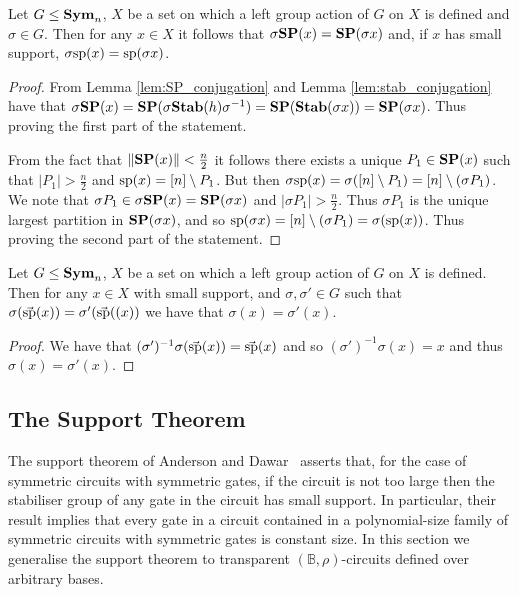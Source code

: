 \documentclass[../paper.tex]{subfiles}
\begin{document}
\begin{lem}
  \label{lem:support-mapping}
  Let $G \leq \text{\textbf{Sym}}_n$, $X$ be a set on which a left group action of $G$ on $X$
  is defined and $\sigma \in G$. Then for any $x \in X$ it follows that $\sigma
  \text{\textbf{SP}} (x) = \text{\textbf{SP}} (\sigma x)$ and, if $x$ has small support, $\sigma \text{sp} (x) =
  \text{sp} (\sigma x)$.
\end{lem}
\begin{proof}
  From Lemma \ref{lem:SP_conjugation} and Lemma \ref{lem:stab_conjugation} have
  that $\sigma \text{\textbf{SP}} (x) = \text{\textbf{SP}}(\sigma \text{\textbf{Stab}}(h) \sigma^{-1}) = \text{\textbf{SP}} (\text{\textbf{Stab}}(\sigma
  x)) = \text{\textbf{SP}} (\sigma x)$. Thus proving the first part of the statement.

  From the fact that $\| \text{\textbf{SP}}(x) \| < \frac{n}{2}$ it follows there exists a
  unique $P_1 \in \text{\textbf{SP}}(x)$ such that $\vert P_1 \vert > \frac{n}{2}$ and
  $\text{sp}(x) = [n] \setminus P_1$. But then $\sigma \text{sp} (x) = \sigma([n]
  \setminus P_1) = [n] \setminus (\sigma P_1)$. We note that $\sigma P_1 \in
  \sigma \text{\textbf{SP}} (x) = \text{\textbf{SP}}(\sigma x)$ and $\vert \sigma P_1 \vert > \frac{n}{2}$.
  Thus $\sigma P_1$ is the unique largest partition in $\text{\textbf{SP}}(\sigma x)$, and so
  $\text{sp}(\sigma x) = [n]\setminus (\sigma P_1) = \sigma (\text{sp}(x))$. Thus
  proving the second part of the statement.
\end{proof}

\begin{lem}
  Let $G \leq \text{\textbf{Sym}}_n$, $X$ be a set on which a left group action of $G$ on $X$
  is defined. Then for any $x \in X$ with small support, and $\sigma, \sigma'
  \in G$ such that $\sigma (\vec{\text{sp}}(x)) = \sigma' (\vec{\text{sp}}((x))$ we
  have that $\sigma (x) = \sigma'(x)$.
  \label{lem:support-determine-action}
\end{lem}
\begin{proof}
  We have that $(\sigma')^{-1}\sigma(\vec{\text{sp}}(x)) = \vec{\text{sp}}(x)$ and so
  $(\sigma')^{-1} \sigma (x) = x$ and thus $\sigma (x) = \sigma' (x)$.
\end{proof}


\subsection{The Support Theorem}
The support theorem of Anderson and Dawar~\cite{AndersonD17} asserts that, for
the case of symmetric circuits with symmetric gates, if the circuit is not too
large then the stabiliser group of any gate in the circuit has small support. In
particular, their result implies that every gate in a circuit contained in a
polynomial-size family of symmetric circuits with symmetric gates is constant
size. In this section we generalise the support theorem to transparent
$(\mathbb{B}, \rho)$-circuits defined over arbitrary bases.
\end{document}
